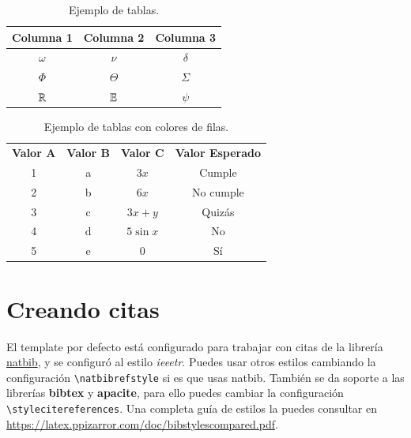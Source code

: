 \begin{table}[H] %
	\centering
	\caption{Ejemplo de tablas.}
	\begin{tabular}{ccc}
		\hline
		\textbf{Columna 1} & \textbf{Columna 2} & \textbf{Columna 3} \bigstrut\\
		\hline
		$\omega$ & $\nu$ & $\delta$ \bigstrut[t]\\
		$\Phi$ & $\Theta$ & $\varSigma$ \\
		$\mathbb{R}$ & $\mathbb{E}$ & $\psi$ \\
		\hline
	\end{tabular}
	\label{tab:tabla-1}
\end{table}

\enabletablerowcolor
\begin{table}[H]
	\centering
	\caption{Ejemplo de tablas con colores de filas.}
	\begin{tabular}{ccccc}
		\rowcolor[rgb]{ .749,  .749,  .749} \textbf{Valor A} & \textbf{Valor B} & \textbf{Valor C} & \multicolumn{2}{c}{\textbf{Valor Esperado}} \\
		1     & a     & $3x$  & \multicolumn{2}{c}{Cumple} \\
		2     & b     & $6x$  & \multicolumn{2}{c}{No cumple} \\
		3     & c     & $3x+y$ & \multicolumn{2}{c}{Quizás} \\
		4     & d     & $5\sin x$ & \multicolumn{2}{c}{No} \\
		5     & e     & $0$ & \multicolumn{2}{c}{Sí} \\
	\end{tabular}
\end{table}
\disabletablerowcolor
	
\section{Creando citas}

El template por defecto está configurado para trabajar con citas de la librería \href{https://www.ctan.org/pkg/natbib}{natbib}, y se configuró al estilo \textit{ieeetr}. Puedes usar otros estilos cambiando la configuración \texttt{\textbackslash natbibrefstyle} si es que usas natbib. También se da soporte a las librerías \textbf{bibtex} y \textbf{apacite}, para ello puedes cambiar la configuración \texttt{\textbackslash stylecitereferences}. Una completa guía de estilos la puedes consultar en \url{https://latex.ppizarror.com/doc/bibstylescompared.pdf}. \\

